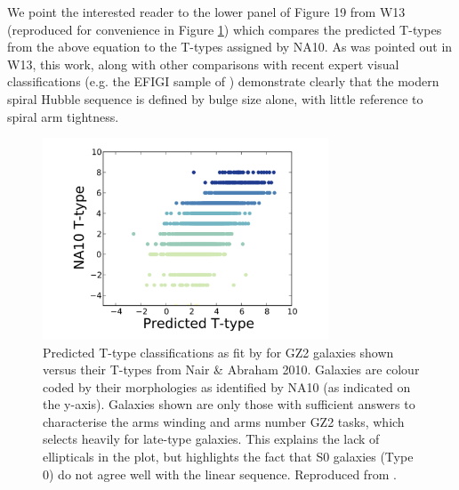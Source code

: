 \documentclass[usenatbib]{mn2e}
\begin{document}
We point the interested reader to the lower panel of Figure 19 from W13 (reproduced for convenience in Figure \ref{T-type}) which compares the predicted T-types from the above equation to the T-types assigned by NA10. As was pointed out in W13, this work, along with other comparisons with recent expert visual classifications (e.g. the EFIGI sample of \citealt{EFIGI}) demonstrate clearly that the modern spiral Hubble sequence is defined by bulge size alone, with little reference to spiral arm tightness. 

\begin{figure}
\includegraphics[height=60mm,angle=0]{T-typeW13.png}
\caption{Predicted T-type classifications as fit by \citet{Willett2013} for GZ2 galaxies shown versus their T-types from Nair \& Abraham 2010. Galaxies are colour coded by their morphologies as identified by NA10 (as indicated on the y-axis). Galaxies shown are only those with sufficient answers to characterise the arms winding and arms number GZ2 tasks, which selects heavily for late-type galaxies. This explains the lack of ellipticals in the plot, but highlights the fact that S0 galaxies (Type 0) do not agree well with the linear sequence. Reproduced from \citet{Willett2013}.  \label{T-type}}
\end{figure}

\end{document}
